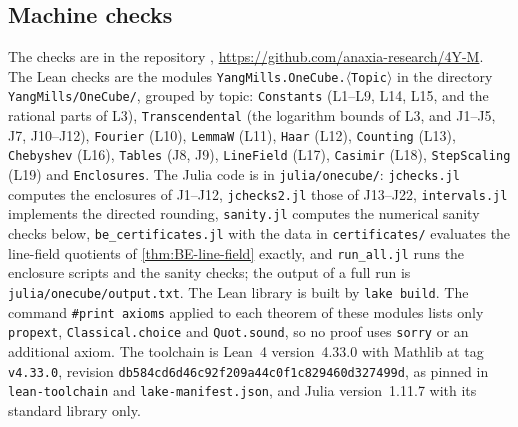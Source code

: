 \documentclass[11pt,a4paper]{amsart}
\theoremstyle{definition}
\theoremstyle{remark}
\numberwithin{equation}{section}
\begin{document}
\subsection{Machine checks}
The checks are in the repository \cite{repo4YM}, \url{https://github.com/anaxia-research/4Y-M}. The Lean checks are the modules \texttt{YangMills.OneCube.$\langle$Topic$\rangle$} in the directory \texttt{YangMills/OneCube/}, grouped by topic: \texttt{Constants} (L1--L9, L14, L15, and the rational parts of L3), \texttt{Transcendental} (the logarithm bounds of L3, and J1--J5, J7, J10--J12), \texttt{Fourier} (L10), \texttt{LemmaW} (L11), \texttt{Haar} (L12), \texttt{Counting} (L13), \texttt{Chebyshev} (L16), \texttt{Tables} (J8, J9), \texttt{LineField} (L17), \texttt{Casimir} (L18), \texttt{StepScaling} (L19) and \texttt{Enclosures}. The Julia code is in \texttt{julia/onecube/}: \texttt{jchecks.jl} computes the enclosures of J1--J12, \texttt{jchecks2.jl} those of J13--J22, \texttt{intervals.jl} implements the directed rounding, \texttt{sanity.jl} computes the numerical sanity checks below, \texttt{be\_certificates.jl} with the data in \texttt{certificates/} evaluates the line-field quotients of \cref{thm:BE-line-field} exactly, and \texttt{run\_all.jl} runs the enclosure scripts and the sanity checks; the output of a full run is \texttt{julia/onecube/output.txt}. The Lean library is built by \texttt{lake build}. The command \texttt{\#print axioms} applied to each theorem of these modules lists only \texttt{propext}, \texttt{Classical.choice} and \texttt{Quot.sound}, so no proof uses \texttt{sorry} or an additional axiom. The toolchain is Lean~4 version~4.33.0 \cite{demoura2021} with Mathlib \cite{mathlib2020} at tag \texttt{v4.33.0}, revision \texttt{db584cd6d46c92f209a44c0f1c829460d327499d}, as pinned in \texttt{lean-toolchain} and \texttt{lake-manifest.json}, and Julia \cite{bezanson2017} version~1.11.7 with its standard library only.
\end{document}
